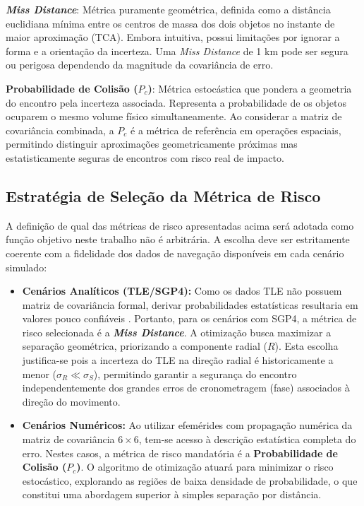 \textbf{\textit{Miss Distance}}: Métrica puramente geométrica, definida como a distância euclidiana mínima entre os centros de massa dos dois objetos no instante de maior aproximação (TCA). Embora intuitiva, possui limitações por ignorar a forma e a orientação da incerteza. Uma \textit{Miss Distance} de 1 km pode ser segura ou perigosa dependendo da magnitude da covariância de erro.

\textbf{Probabilidade de Colisão ($P_c$)}: Métrica estocástica que pondera a geometria do encontro pela incerteza associada. Representa a probabilidade de os objetos ocuparem o mesmo volume físico simultaneamente. Ao considerar a matriz de covariância combinada, a $P_c$ é a métrica de referência em operações espaciais, permitindo distinguir aproximações geometricamente próximas mas estatisticamente seguras de encontros com risco real de impacto.

\subsection{Estratégia de Seleção da Métrica de Risco}
\label{subsec:selecao_metricas}

A definição de qual das métricas de risco apresentadas acima será adotada como função objetivo neste trabalho não é arbitrária. A escolha deve ser estritamente coerente com a fidelidade dos dados de navegação disponíveis em cada cenário simulado:

\begin{itemize}
    \item \textbf{Cenários Analíticos (TLE/SGP4):} Como os dados TLE não possuem matriz de covariância formal, derivar probabilidades estatísticas resultaria em valores pouco confiáveis \cite{Klinkrad2006}. Portanto, para os cenários com SGP4, a métrica de risco selecionada é a \textbf{\textit{Miss Distance}}. A otimização busca maximizar a separação geométrica, priorizando a componente radial ($R$). Esta escolha justifica-se pois a incerteza do TLE na direção radial é historicamente a menor ($\sigma_R \ll \sigma_S$), permitindo garantir a segurança do encontro independentemente dos grandes erros de cronometragem (fase) associados à direção do movimento.
    
    \item \textbf{Cenários Numéricos:} Ao utilizar efemérides com propagação numérica da matriz de covariância $6 \times 6$, tem-se acesso à descrição estatística completa do erro. Nestes casos, a métrica de risco mandatória é a \textbf{Probabilidade de Colisão ($P_c$)}. O algoritmo de otimização atuará para minimizar o risco estocástico, explorando as regiões de baixa densidade de probabilidade, o que constitui uma abordagem superior à simples separação por distância.
\end{itemize}

